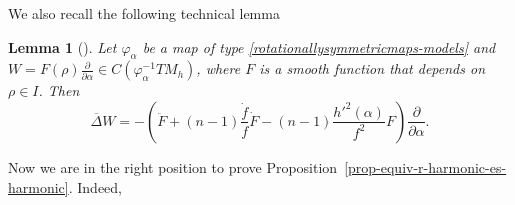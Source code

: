 \documentclass[11pt]{amsart}
\theoremstyle{plain}
\newtheorem{lemma}        [theorem]  {Lemma}
\theoremstyle{definition}
\numberwithin{equation}{section}
\numberwithin{equation}{section}
\begin{document}
\vspace{3mm}

We also recall the following technical lemma

\begin{lemma}[\cite{BMOR1}]\label{lemma-rough-laplacian-partialt}
	Let $\varphi_{\alpha}$ be a map of type \eqref{rotationallysymmetricmaps-models} and $W = F(\rho) \frac{\partial}{\partial \alpha} \in C(\varphi_{\alpha}^{-1}T M_h)$, where $F$ is a smooth function that depends on $\rho \in I$. Then
	\begin{equation}\label{expr-rough-laplacian-partialt}
		\overline{\Delta} W = -\left(\ddot{F} + (n-1)\frac{\dot{f}}{f}\dot{F}-(n-1)\frac{h'^2(\alpha)}{f^2}F\right)\frac{\partial}{\partial \alpha}.
	\end{equation}
\end{lemma}

Now we are in the right position to prove Proposition~\ref{prop-equiv-r-harmonic-es-harmonic}. Indeed, 
\end{document}
